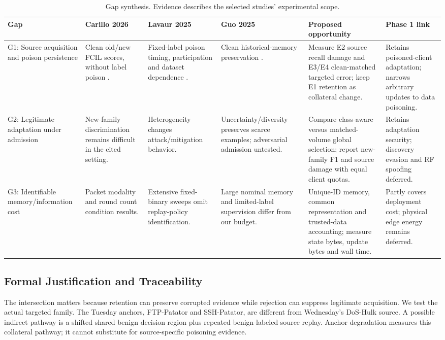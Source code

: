 \documentclass[10pt,a4paper]{article}
\begin{document}
\begin{landscape}
\begin{table}[p]
\centering\footnotesize
\caption{Gap synthesis. Evidence describes the selected studies' experimental scope.}
\label{tab:gaps}
\begin{tabularx}{\linewidth}{L{2.3cm}Y Y Y Y L{2.4cm}}
\toprule
Gap & Carillo 2026 & Lavaur 2025 & Guo 2025 & Proposed opportunity & Phase 1 link\\
\midrule
G1: Source acquisition and poison persistence
& Clean old/new FCIL scores, without label poison \cite{carillo}.
& Fixed-label poison timing, participation and dataset dependence \cite{lavaur}.
& Clean historical-memory preservation \cite{guo}.
& Measure E2 source recall damage and E3/E4 clean-matched targeted error; keep E1 retention as collateral change.
& Retains poisoned-client adaptation; narrows arbitrary updates to data poisoning.\\[5pt]
G2: Legitimate adaptation under admission
& New-family discrimination remains difficult in the cited setting.
& Heterogeneity changes attack/mitigation behavior.
& Uncertainty/diversity preserves scarce examples; adversarial admission untested.
& Compare class-aware versus matched-volume global selection; report new-family F1 and source damage with equal client quotas.
& Retains adaptation security; discovery evasion and RF spoofing deferred.\\[5pt]
G3: Identifiable memory/information cost
& Packet modality and round count condition results.
& Extensive fixed-binary sweeps omit replay-policy identification.
& Large nominal memory and limited-label supervision differ from our budget.
& Unique-ID memory, common representation and trusted-data accounting; measure state bytes, update bytes and wall time.
& Partly covers deployment cost; physical edge energy remains deferred.\\
\bottomrule
\end{tabularx}
\end{table}
\end{landscape}

\subsection{Formal Justification and Traceability}
The intersection matters because retention can preserve corrupted evidence while rejection can suppress legitimate acquisition. We test the actual targeted family. The Tuesday anchors, FTP-Patator and SSH-Patator, are different from Wednesday's DoS-Hulk source. A possible indirect pathway is a shifted shared benign decision region plus repeated benign-labeled source replay. Anchor degradation measures this collateral pathway; it cannot substitute for source-specific poisoning evidence.
\end{document}
